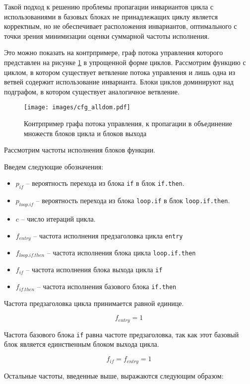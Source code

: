 Такой подход к решению проблемы пропагации инвариантов цикла с использованиями в базовых блоках не принадлежащих циклу является корректным, но не обеспечивает расположения инвариантов, оптимального с точки зрения минимизации оценки суммарной частоты исполнения.

Это можно показать на контрпримере, граф потока управления которого представлен на рисунке \ref{fig:cfg_alldom} в упрощенной форме циклов.
Рассмотрим функцию с циклом, в котором существует ветвление потока управления и лишь одна из ветвей содержит использование инварианта.
Блоки циклов доминируют над подграфом, в котором существует аналогичное ветвление.

\begin{figure}
    \centering
    \texttt{[image: images/cfg\_alldom.pdf]}
    \caption{Контрпример графа потока управления, к пропагации в объединение множеств блоков цикла и блоков выхода}
    \label{fig:cfg_alldom}
\end{figure}

Рассмотрим частоты исполнения блоков функции.

Введем следующие обозначения:
\begin{itemize}
    \item $p_{if}$ -- вероятность перехода из блока \texttt{if} в блок \texttt{if.then}.
    \item $p_{loop.if}$ -- вероятность перехода из блока \texttt{loop.if} в блок \texttt{loop.if.then}.
    \item $c$ -- число итераций цикла.
    \item $f_{entry}$ -- частота исполнения предзаголовка цикла \texttt{entry}
    \item $f_{loop.if.then}$ -- частота исполнения блока цикла \texttt{loop.if.then}
    \item $f_{if}$ -- частота исполнения блока выхода цикла \texttt{if}
    \item $f_{if.then}$ -- частота исполнения базового блока \texttt{if.then}
\end{itemize}

Частота предзаголовка цикла принимается равной единице.

$$ f_{entry} = 1 $$

Частота базового блока \texttt{if} равна частоте предзаголовка, так как этот базовый блок является единственным блоком выхода цикла.

$$ f_{if} = f_{entry} = 1 $$

Остальные частоты, введенные выше, выражаются следующим образом:

